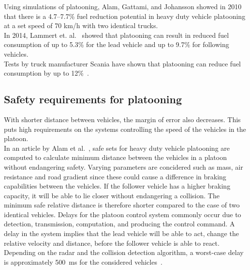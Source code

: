 Using simulations of platooning, Alam, Gattami, and Johansson \cite{johansson2010} showed in 2010 that there is a \mbox{4.7--7.7\%} fuel reduction potential in heavy duty vehicle platooning at a set speed of 70 km/h with two identical trucks.\\

In 2014, Lammert et. al.~\cite{lammert2014} showed that platooning can result in reduced fuel consumption of up to 5.3\% for the lead vehicle and up to 9.7\% for following vehicles.\\

Tests by truck manufacturer Scania have shown that platooning can reduce fuel consumption by up to 12\%~\cite{scania2015}.

\subsection{Safety requirements for platooning}
With shorter distance between vehicles, the margin of error also decreases. This puts high requirements on the systems controlling the speed of the vehicles in the platoon.\\

In an article by Alam et al.~\cite{johansson2013}, safe sets for heavy duty vehicle platooning are computed to calculate minimum distance between the  vehicles in a platoon without endangering safety. Varying parameters are concidered such as mass, air resistance and road gradient since these could cause a difference in braking capabilities between the vehicles. If the follower vehicle has a higher braking capacity, it will be able to lie closer without endangering a collision. The minimum safe relative distance is therefore shorter compared to the case of two identical vehicles. Delays for the platoon control system commonly occur due to detection, transmission, computation, and producing the control command. A delay in the system implies that the lead vehicle will be able to act, change the relative velocity and distance, before the follower vehicle is able to react. Depending on the radar and the collision detection algorithm, a worst-case delay is approximately 500~ms for the considered vehicles~\cite{johansson2013}. %
%
